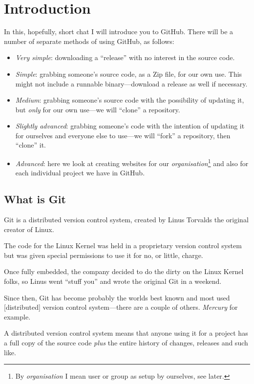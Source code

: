 \chapter{Introduction}

In this, hopefully, short chat I will introduce you to GitHub. There will be a number of separate methods of using GitHub, as follows:

\begin{itemize}
    \item \emph{Very simple}: downloading a ``release'' with no interest in the source code.
    \item \emph{Simple}: grabbing someone's source code, as a Zip file, for our own use. This might not include a runnable binary---download a release as well if necessary.
    \item \emph{Medium}: grabbing someone's source code with the possibility of updating it, but \emph{only} for our own use---we will ``clone'' a repository.
    \item \emph{Slightly advanced}: grabbing someone's code with the intention of updating it for ourselves and everyone else to use---we will ``fork'' a repository, then ``clone'' it.
    \item \emph{Advanced}: here we look at creating websites for our \emph{organisation}\footnote{By \emph{organisation} I mean user or group as setup by ourselves, see later.} and also for each individual project we have in GitHub.
\end{itemize}

\section{What is Git}
Git is a distributed version control system, created by Linus Torvalds the original creator of Linux.

The code for the Linux Kernel was held in a proprietary version control system but was given special permissions to use it for no, or little, charge.

Once fully embedded, the company decided to do the dirty on the Linux Kernel folks, so Linus went ``stuff you'' and wrote the original Git in a weekend.

Since then, Git has become probably the worlds best known and most used [distributed] version control system---there are a couple of others. \emph{Mercury} for example.

A distributed version control system means that anyone using it for a project has a full copy of the source code \emph{plus} the entire history of changes, releases and such like.


